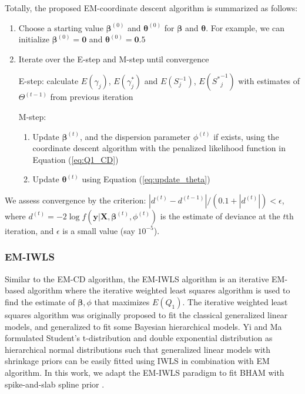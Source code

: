\documentclass[AMA,STIX1COL,]{WileyNJD-v2}
\begin{document}
Totally, the proposed EM-coordinate descent algorithm is summarized as
follows:

\begin{enumerate}
\def\labelenumi{\arabic{enumi})}
\item
  Choose a starting value \(\boldsymbol{\beta}^{(0)}\) and
  \(\boldsymbol{\theta}^{(0)}\) for \(\boldsymbol{\beta}\) and
  \(\boldsymbol{\theta}\). For example, we can initialize
  \(\boldsymbol{\beta}^{(0)} = \boldsymbol{0}\) and
  \(\boldsymbol{\theta}^{(0)} = \boldsymbol{0}.5\)
\item
  Iterate over the E-step and M-step until convergence

  E-step: calculate \(E(\gamma_{j})\), \(E(\gamma^*_{j})\) and
  \(E({S}^{-1}_{j})\), \(E({S^*}^{-1}_{j})\) with estimates of
  \(\Theta^{(t-1)}\) from previous iteration

  M-step:

  \begin{enumerate}
  \def\labelenumii{\alph{enumii})}
  \item
    Update \(\boldsymbol{\beta}^{(t)}\), and the dispersion parameter
    \(\phi^{(t)}\) if exists, using the coordinate descent algorithm
    with the penalized likelihood function in Equation (\ref{eq:Q1_CD})
  \item
    Update \(\boldsymbol{\theta}^{(t)}\) using Equation
    (\ref{eq:update_theta})
  \end{enumerate}
\end{enumerate}

We assess convergence by the criterion:
\(|d^{(t)}-d^{(t-1)}|/(0.1+|d^{(t)}|)<\epsilon\), where
\(d^{(t)} = -2\log f(\textbf{y}| \textbf{X}, \boldsymbol{\beta}^{(t)},\phi^{(t)})\)
is the estimate of deviance at the \(t\)th iteration, and \(\epsilon\)
is a small value (say \(10^{-5}\)).

\hypertarget{em-iwls}{%
\subsubsection{EM-IWLS}\label{em-iwls}}

Similar to the EM-CD algorithm, the EM-IWLS algorithm is an iterative
EM-based algorithm where the iterative weighted least squares algorithm
is used to find the estimate of \(\boldsymbol{\beta}, \phi\) that
maximizes \(E(Q_1)\). The iterative weighted least squares algorithm was
originally proposed to fit the classical generalized linear models, and
generalized to fit some Bayesian hierarchical models.\citep{Gelman2013}
Yi and Ma \citep{Yi2012} formulated Student's t-distribution and double
exponential distribution as hierarchical normal distributions such that
generalized linear models with shrinkage priors can be easily fitted
using IWLS in combination with EM algorithm. In this work, we adapt the
EM-IWLS paradigm to fit BHAM with spike-and-slab spline prior .
\end{document}
